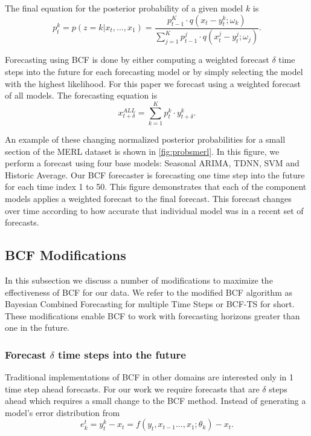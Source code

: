 The final equation for the posterior probability of a given model $k$ is
\begin{equation}
\label{eq:model_prob}
p_{t}^{k} = p(z = k|x_{t}, ..., x_{1}) = \frac{p_{t - 1}^{K} \cdot q(x_{t} - y_{t}^{k}; \omega_{k})}{\sum_{j=1}^{K}p_{t - 1}^{j} \cdot q(x_{t}^{j} - y_{t}^{j}; \omega_{j})}.
\end{equation}

Forecasting using BCF is done by either computing a weighted forecast $\delta$ time steps into the future for each forecasting model or by simply selecting the model with the highest likelihood.  For this paper we forecast using a weighted forecast of all models.  The forecasting equation is
\begin{equation}
x_{t + \delta}^{ALL} = \sum_{k=1}^{K}p_{t}^{k} \cdot y_{t + \delta}^{k}.
\end{equation}

An example of these changing normalized posterior probabilities for a small section of the MERL dataset is shown in \ref{fig:probsmerl}.  In this figure, we perform a forecast using four base models: Seasonal ARIMA, TDNN, SVM and Historic Average.  Our BCF forecaster is forecasting one time step into the future for each time index 1 to 50.  This figure demonstrates that each of the component models applies a weighted forecast to the final forecast.  This forecast changes over time according to how accurate that individual model was in a recent set of forecasts.


\subsection{BCF Modifications}
In this subsection we discuss a number of modifications to maximize the effectiveness of BCF for our data.  We refer to the modified BCF algorithm as Bayesian Combined Forecasting for multiple Time Steps or BCF-TS for short.  These modifications  enable BCF to work with forecasting horizons greater than one in the future.

\subsubsection{Forecast $\delta$ time steps into the future}
Traditional implementations of BCF in other domains \cite{Petridis2001, Zheng2006} are interested only in 1 time step ahead forecasts.  For our work we require forecasts that are $\delta$ steps ahead which requires a small change to the BCF method.  Instead of generating a model's error distribution from 
\begin{equation}
e^{t}_{k} = y_{t}^{k} - x_{t} = f(y_{t},x_{t - 1} ..., x_{1}; \theta_{k}) - x_{t}.
\end{equation}

